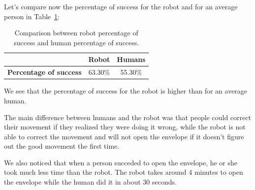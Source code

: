 Let's compare now the percentage of success for the robot and for an average person in Table~\ref{tab:comprobothuman}:
\begin{table}[htbp]
	\centering
	\begin{tabular}{|l|c|c|}
		\cmidrule{2-3}    \multicolumn{1}{r|}{} & \textbf{Robot} & \textbf{Humans} \\
		\midrule
		\textbf{Percentage of success} & 63.30\% & 55.30\% \\
		\bottomrule
	\end{tabular}%
	\caption{Comparison between robot percentage of success and human percentage of success.}
	\label{tab:comprobothuman}%
\end{table}%

We see that the percentage of success for the robot is higher than for an average human. 

The main difference between humans and the robot was that people could correct their movement if they realized they were doing it wrong, while the robot is not able to correct the movement and will not open the envelope if it doesn't figure out the good movement the first time.

We also noticed that when a person succeded to open the envelope, he or she took much less time than the robot. The robot takes around 4 minutes to open the envelope while the human did it in about 30 seconds.
